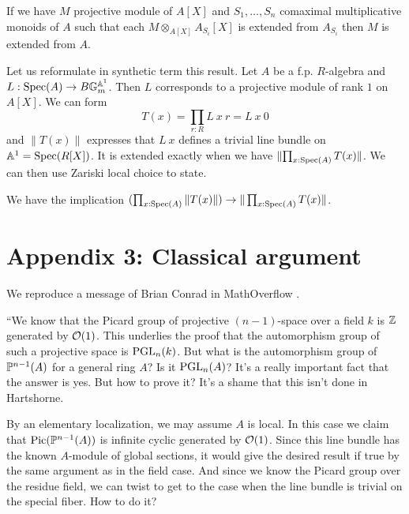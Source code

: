 \begin{corollary}
  If we have $M$ projective module of $A[X]$ and $S_1,\dots,S_n$ comaximal multiplicative monoids of $A$
  such that each $M\otimes_{A[X]} A_{S_i}[X]$ is extended from $A_{S_i}$ then $M$ is extended from $A$.
\end{corollary}

Let us reformulate in synthetic term this result. Let $A$ be a f.p. $R$-algebra and $L:\operatorname{Spec}(A)\rightarrow B\mathbb{G}_m^{\mathbb{A}^1}$.
Then $L$ corresponds to a projective module of rank $1$ on $A[X]$. We can form
$$T(x) = \prod_{r:R}L~x~r = L~x~0$$
and $\|T(x)\|$ expresses that $L~x$ defines a trivial line bundle on $\mathbb{A}^1 = \operatorname{Spec}(R[X])$.
It is extended exactly when we have
$\|{\prod_{x:\operatorname{Spec}(A)}T(x)}\|$. We can then use Zariski local choice to state.

\begin{proposition}\label{c2}
  We have the implication $(\prod_{x:\operatorname{Spec}(A)}\|T(x)\|)\rightarrow \|\prod_{x:\operatorname{Spec}(A)}T(x)\|$.
\end{proposition}

\newpage

\section*{Appendix 3: Classical argument}

We reproduce a message of Brian Conrad in MathOverflow \cite{conrad-mathoverflow-16324}.

\medskip

``We know that the Picard group of projective $(n-1)$-space over a field $k$ is $\mathbb{Z}$
generated by $\mathcal{O}(1)$.
This underlies the proof that the automorphism group of such a projective space is $\operatorname{PGL}_n(k)$.
But what is the automorphism group of $\mathbb{P}^{n-1}(A)$ for a general ring $A$? Is it $\operatorname{PGL}_n(A)$?
It's a really important fact that the answer is yes.
But how to prove it? It's a shame that this isn't done in Hartshorne.

By an elementary localization, we may assume $A$ is local.
In this case we claim that $\mathrm{Pic}(\mathbb{P}^{n-1}(A))$ is infinite cyclic generated by $\mathcal{O}(1)$.
Since this line bundle has the known $A$-module of global sections,
it would give the desired result if true by the same argument as in the field case.
And since we know the Picard group over the residue field, we can twist
to get to the case when the line bundle is trivial on the special fiber. How to do it?

\medskip


